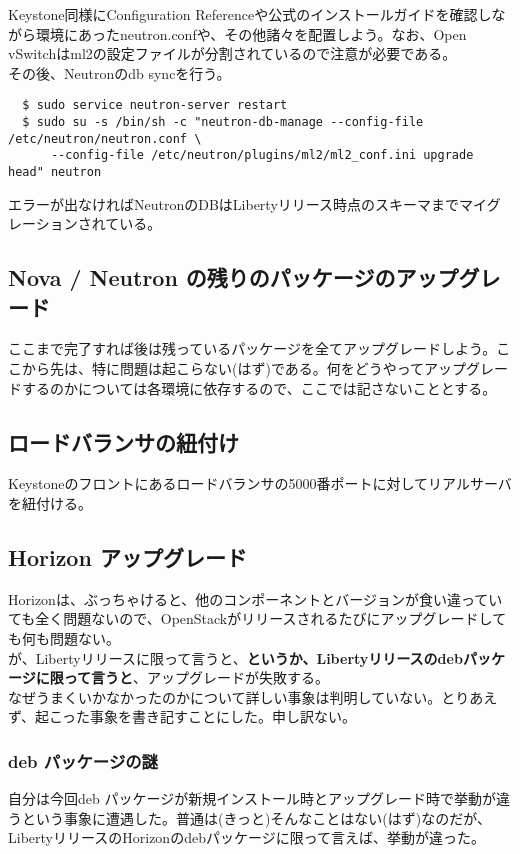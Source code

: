 \documentclass[9pt,b5paper,tombo,openany]{jsbook}
\begin{document}
Keystone同様にConfiguration Referenceや公式のインストールガイドを確認しながら環境にあったneutron.confや、その他諸々を配置しよう。なお、Open vSwitchはml2の設定ファイルが分割されているので注意が必要である。\\[1ex]

\noindent
その後、Neutronのdb syncを行う。
\begin{lstlisting}
  $ sudo service neutron-server restart
  $ sudo su -s /bin/sh -c "neutron-db-manage --config-file /etc/neutron/neutron.conf \
      --config-file /etc/neutron/plugins/ml2/ml2_conf.ini upgrade head" neutron
\end{lstlisting}

\noindent
エラーが出なければNeutronのDBはLibertyリリース時点のスキーマまでマイグレーションされている。

\subsection{Nova / Neutron の残りのパッケージのアップグレード}
ここまで完了すれば後は残っているパッケージを全てアップグレードしよう。ここから先は、特に問題は起こらない(はず)である。何をどうやってアップグレードするのかについては各環境に依存するので、ここでは記さないこととする。

\subsection{ロードバランサの紐付け}
Keystoneのフロントにあるロードバランサの5000番ポートに対してリアルサーバを紐付ける。

\subsection{Horizon アップグレード}
Horizonは、ぶっちゃけると、他のコンポーネントとバージョンが食い違っていても全く問題ないので、OpenStackがリリースされるたびにアップグレードしても何も問題ない。\\[1ex]

が、Libertyリリースに限って言うと、\textbf{というか、Libertyリリースのdebパッケージに限って言うと}、アップグレードが失敗する。\\[1ex]

なぜうまくいかなかったのかについて詳しい事象は判明していない。とりあえず、起こった事象を書き記すことにした。申し訳ない。

\subsubsection{deb パッケージの謎}
自分は今回deb パッケージが新規インストール時とアップグレード時で挙動が違うという事象に遭遇した。普通は(きっと)そんなことはない(はず)なのだが、LibertyリリースのHorizonのdebパッケージに限って言えば、挙動が違った。\\[1ex]
\end{document}
